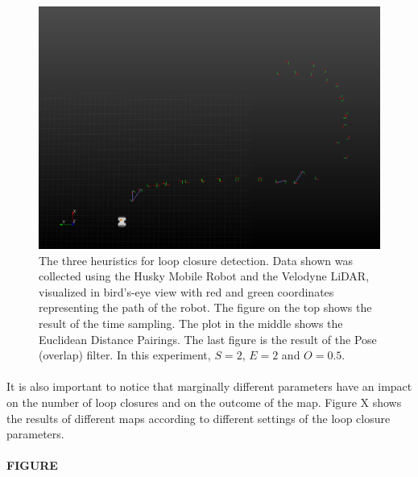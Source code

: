 \documentclass[11pt]{article}
\begin{document}
\begin{figure}
\begin{minipage}{0.67\textwidth}
				\includegraphics[width=\textwidth]{LoopClosureFinal}
	\end{minipage}\hfill
	\begin{minipage}{0.33\textwidth}
		\centering
		\caption[t]{The three heuristics for loop closure detection. Data shown was collected using the Husky Mobile Robot and the Velodyne LiDAR, visualized in bird's-eye view with red and green coordinates representing the path of the robot. The figure on the top shows the result of the time sampling. The plot in the middle shows the Euclidean Distance Pairings. The last figure is the result of the Pose (overlap) filter. In this experiment, $S=2$, $E=2$ and $O=0.5$.}
		\label{fig:loopClosureDetection}
	\end{minipage}
	\end{figure}
	\paragraph{}
	It is also important to notice that marginally different parameters have an impact on the number of loop closures and on the outcome of the map. Figure X shows the results of different maps according to different settings of the loop closure parameters.
		
	\paragraph{FIGURE}
	
\end{document}
